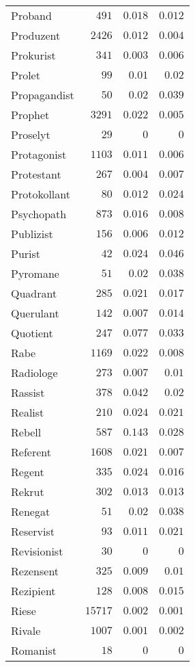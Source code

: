 \begin{supertabular}{lrrr}
Proband & $491$ & $0.018$ & $0.012$ \\
Produzent & $2426$ & $0.012$ & $0.004$ \\
Prokurist & $341$ & $0.003$ & $0.006$ \\
Prolet & $99$ & $0.01$ & $0.02$ \\
Propagandist & $50$ & $0.02$ & $0.039$ \\
Prophet & $3291$ & $0.022$ & $0.005$ \\
Proselyt & $29$ & $0$ & $0$ \\
Protagonist & $1103$ & $0.011$ & $0.006$ \\
Protestant & $267$ & $0.004$ & $0.007$ \\
Protokollant & $80$ & $0.012$ & $0.024$ \\
Psychopath & $873$ & $0.016$ & $0.008$ \\
Publizist & $156$ & $0.006$ & $0.012$ \\
Purist & $42$ & $0.024$ & $0.046$ \\
Pyromane & $51$ & $0.02$ & $0.038$ \\
Quadrant & $285$ & $0.021$ & $0.017$ \\
Querulant & $142$ & $0.007$ & $0.014$ \\
Quotient & $247$ & $0.077$ & $0.033$ \\
Rabe & $1169$ & $0.022$ & $0.008$ \\
Radiologe & $273$ & $0.007$ & $0.01$ \\
Rassist & $378$ & $0.042$ & $0.02$ \\
Realist & $210$ & $0.024$ & $0.021$ \\
Rebell & $587$ & $0.143$ & $0.028$ \\
Referent & $1608$ & $0.021$ & $0.007$ \\
Regent & $335$ & $0.024$ & $0.016$ \\
Rekrut & $302$ & $0.013$ & $0.013$ \\
Renegat & $51$ & $0.02$ & $0.038$ \\
Reservist & $93$ & $0.011$ & $0.021$ \\
Revisionist & $30$ & $0$ & $0$ \\
Rezensent & $325$ & $0.009$ & $0.01$ \\
Rezipient & $128$ & $0.008$ & $0.015$ \\
Riese & $15717$ & $0.002$ & $0.001$ \\
Rivale & $1007$ & $0.001$ & $0.002$ \\
Romanist & $18$ & $0$ & $0$ \\

\end{supertabular}
